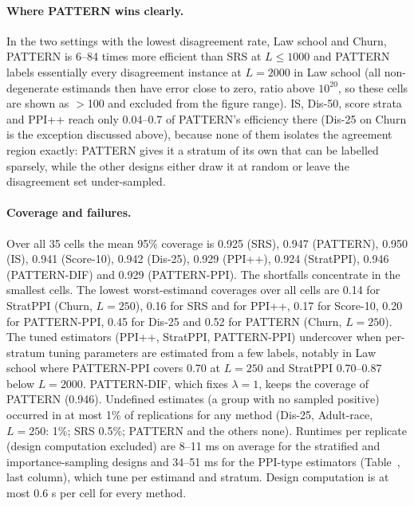 \paragraph{Where PATTERN wins clearly.} In the two settings with the lowest disagreement rate, Law school and Churn, PATTERN is 6--84 times more efficient than SRS at $L\le1000$ and PATTERN labels essentially every disagreement instance at $L=2000$ in Law school (all non-degenerate estimands then have error close to zero, ratio above $10^{20}$, so these cells are shown as $>$100 and excluded from the figure range). IS, Dis-50, score strata and PPI++ reach only 0.04--0.7 of PATTERN's efficiency there (Dis-25 on Churn is the exception discussed above), because none of them isolates the agreement region exactly: PATTERN gives it a stratum of its own that can be labelled sparsely, while the other designs either draw it at random or leave the disagreement set under-sampled.

\paragraph{Coverage and failures.} Over all 35 cells the mean 95\% coverage is 0.925 (SRS), 0.947 (PATTERN), 0.950 (IS), 0.941 (Score-10), 0.942 (Dis-25), 0.929 (PPI++), 0.924 (StratPPI), 0.946 (PATTERN-DIF) and 0.929 (PATTERN-PPI). The shortfalls concentrate in the smallest cells. The lowest worst-estimand coverages over all cells are 0.14 for StratPPI (Churn, $L=250$), 0.16 for SRS and for PPI++, 0.17 for Score-10, 0.20 for PATTERN-PPI, 0.45 for Dis-25 and 0.52 for PATTERN (Churn, $L=250$). The tuned estimators (PPI++, StratPPI, PATTERN-PPI) undercover when per-stratum tuning parameters are estimated from a few labels, notably in Law school where PATTERN-PPI covers 0.70 at $L=250$ and StratPPI 0.70--0.87 below $L=2000$. PATTERN-DIF, which fixes $\lambda=1$, keeps the coverage of PATTERN (0.946). Undefined estimates (a group with no sampled positive) occurred in at most 1\% of replications for any method (Dis-25, Adult-race, $L=250$: 1\%; SRS 0.5\%; PATTERN and the others none). Runtimes per replicate (design computation excluded) are 8--11 ms on average for the stratified and importance-sampling designs and 34--51 ms for the PPI-type estimators (Table~, last column), which tune per estimand and stratum. Design computation is at most 0.6 s per cell for every method.

